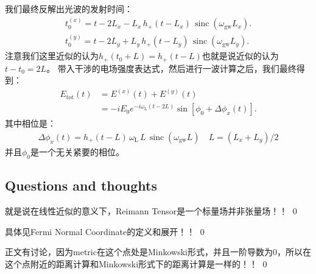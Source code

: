 我们最终反解出光波的发射时间：
\begin{align}
  t_0^{(x)} = t - 2L_x - L_x\, h_+(t -
  L_x)\,\operatorname{sinc}\!\left(\omega_{\mathrm{gw}} L_x\right).\\
  t_0^{(y)} = t - 2L_y + L_y\, h_+(t -
  L_y)\,\operatorname{sinc}\!\left(\omega_{\mathrm{gw}} L_y\right).
\end{align}
注意我们这里近似的认为$ h_+(t_0 +L) = h_+(t - L) $也就是说近似的认为$ t - t_0 = 2L $。
带入干涉的电场强度表达式，然后进行一波计算之后，我们最终得到：
\begin{align}
  E_{\mathrm{tot}}(t)&=E^{(x)}(t)+E^{(y)}(t)\\
  &=-iE_0e^{-i\omega_\mathrm{L}(t-2L)}\sin[\phi_0+\Delta\phi_x(t)].
\end{align}
其中相位是：
\begin{align}
  \Delta\phi_x(t) =
  h_+(t-L)\,\omega_{\mathrm{L}}\,L\,\operatorname{sinc}(\omega_{\mathrm{gw}}L)
  \quad L = (L_x + L_y)/2
\end{align}
并且$ \phi_0 $是一个无关紧要的相位。

\bigskip
{}


\subsection{Questions and thoughts}


就是说在线性近似的意义下，Reimann Tensor是一个标量场并非张量场！！
\qed

\bigskip
{}
具体见Fermi Normal Coordinate的定义和展开！！
\qed

\bigskip
{}
正文有讨论，因为metric在这个点处是Minkowski形式，并且一阶导数为0，所以在这个点附近的距离计算和Minkowski形式下的距离计算是一样的！！
\qed
